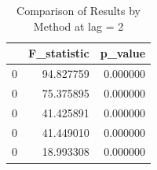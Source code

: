 \begin{table}
\caption{Comparison of Results by Method at lag = 2}
\label{tab:results_by_method}
\begin{tabular}{lrr}
\toprule
 & F\_statistic & p\_value \\
\midrule
0 & 94.827759 & 0.000000 \\
0 & 75.375895 & 0.000000 \\
0 & 41.425891 & 0.000000 \\
0 & 41.449010 & 0.000000 \\
0 & 18.993308 & 0.000000 \\
\bottomrule
\end{tabular}
\end{table}
